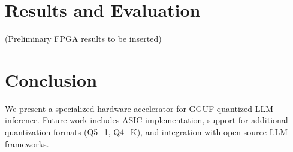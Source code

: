 \documentclass[12pt, conference]{ieeeconf}
\begin{document}
\section{Results and Evaluation}

(Preliminary FPGA results to be inserted)

\section{Conclusion}

We present a specialized hardware accelerator for GGUF-quantized LLM inference. Future work includes ASIC implementation, support for additional quantization formats (Q5\_1, Q4\_K), and integration with open-source LLM frameworks.
\end{document}
